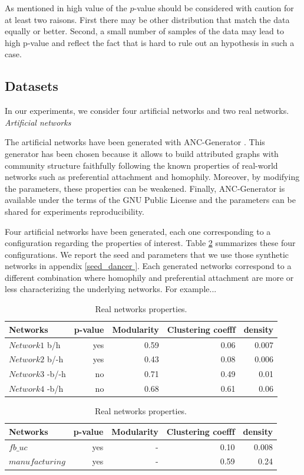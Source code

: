 As mentioned in \cite{clauset2009power} high value of the $p$-value should be considered with caution for at least two raisons. First there may be other distribution that match the data equally or better. Second, a small number of samples of the data may lead to high p-value and reflect the fact that is hard to rule out an hypothesis in such a case.

\subsection{Datasets}
In our experiments, we consider four artificial networks and two real networks.\\

\textit{Artificial networks}

The artificial networks have been generated with ANC-Generator \cite{largeron2015}. This generator has been chosen because it allows to build attributed graphs with  community structure faithfully following the known properties of real-world networks such as preferential attachment and homophily.
Moreover, by modifying the parameters, these properties can be weakened. Finally, ANC-Generator is available under the terms of the GNU Public License and the        parameters can be shared for experiments reproducibility.

Four artificial networks have been generated, each one corresponding to a configuration  regarding the properties of interest.
Table \ref{table:artificial_networks} summarizes these four configurations. We report the seed and parameters that we use those synthetic networks in appendix \ref{seed_dancer	}. Each generated networks correspond to a different combination where homophily and preferential attachment are more or less characterizing the underlying networks. For example...

\begin{table}[h] \label{table:artificial_networks}
	\caption{Artificial networks properties.}
	\begin{tabular}{lrrrr}
		\hline
		Networks   &  p-value    &  Modularity & Clustering coefff & density   \\
		\hline
		$Network1$ b/h   & yes &0.59  & 0.06 & 0.007  \\
		$Network2$ b/-h  & yes &0.43  & 0.08 & 0.006\\
		$Network3$ -b/-h & no  &0.71  & 0.49 & 0.01 \\
		$Network4$ -b/h  & no  &0.68  & 0.61 & 0.06 \\
		\hline
	\end{tabular}
	\caption{Real networks properties.}
	\begin{tabular}{lrrrr}
		\hline
		Networks    &  p-value    &  Modularity & Clustering coefff & density   \\
		\hline
		$fb\_uc$          & yes & -  & 0.10 & 0.008 \\
		$manufacturing$   & yes & -  & 0.59 & 0.24 \\
	\end{tabular}
\end{table}

